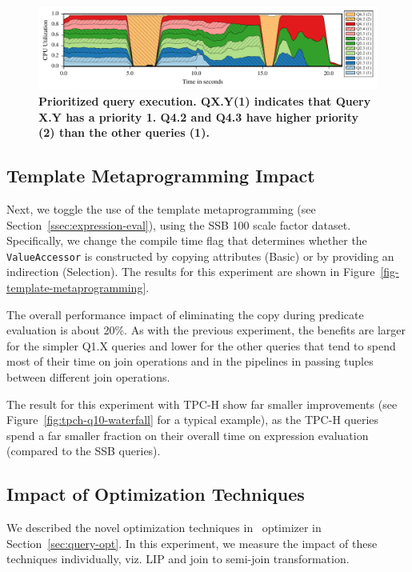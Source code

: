 
\begin{figure}[htb]
   \vspace*{3em}
  \centering
   \includegraphics[width=\textwidth]{system/figures/2-high-priority-queries.pdf}
   \caption{\textbf{Prioritized query execution. QX.Y(1) indicates that Query X.Y has a priority 1. Q4.2 and Q4.3 have higher priority (2) than the other queries (1).}}
   \label{fig-high-priority}
\end{figure}

\subsection{Template Metaprogramming Impact}
\label{sec:expt:vectorization}

Next, we toggle the use of the template metaprogramming (see Section~\ref{ssec:expression-eval}), using the SSB 100 scale factor dataset. Specifically, we change the compile time flag that determines whether the \texttt{ValueAccessor} is constructed by copying attributes (Basic) or by providing an indirection (Selection). The results for this experiment are shown in Figure~\ref{fig-template-metaprogramming}.

The overall performance impact of eliminating the copy during predicate evaluation is about 20\%. As with the previous experiment, the benefits are larger for the simpler Q1.X queries and lower for the other queries that tend to spend most of their time on join operations and in the pipelines in passing tuples between different join operations.

The result for this experiment with TPC-H show far smaller improvements (see Figure~\ref{fig:tpch-q10-waterfall} for a typical example), as the TPC-H queries spend a far smaller fraction on their overall time on expression evaluation (compared to the SSB queries).

\subsection{Impact of Optimization Techniques}
\label{sec:expt:optimization}
We described the novel optimization techniques in \Quickstep\ optimizer in Section~\ref{sec:query-opt}. In this experiment,
we measure the impact of these techniques individually, viz. LIP and join to semi-join transformation.

